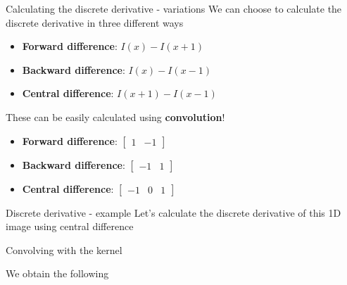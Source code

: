 \documentclass[9pt, aspectratio=169]{beamer}
\begin{document}
\begin{frame}
    {Calculating the discrete derivative - variations}
    We can choose to calculate the discrete derivative in three different ways

    \Large
    \begin{itemize}
        \item \textbf{Forward difference}: $I(x) - I(x+1)$
        \item \textbf{Backward difference}: $I(x) - I(x-1)$
        \item \textbf{Central difference}: $I(x+1) - I(x-1)$
    \end{itemize}

    \pause
    These can be easily calculated using \textbf{convolution}!

    \begin{itemize}
        \item \textbf{Forward difference}: $\begin{bmatrix}1&-1\end{bmatrix}$
        \item \textbf{Backward difference}: $\begin{bmatrix}-1&1\end{bmatrix}$
        \item \textbf{Central difference}: $\begin{bmatrix}-1&0&1\end{bmatrix}$
    \end{itemize}
\end{frame}

\begin{frame}
    {Discrete derivative - example}
    Let's calculate the discrete derivative of this 1D image using central difference


    \pause
    Convolving with the kernel


    We obtain the following

\end{frame}
\end{document}
